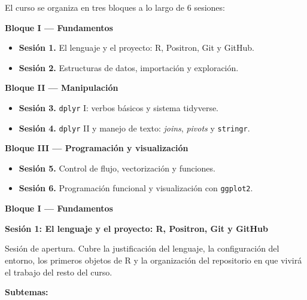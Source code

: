 \documentclass[11pt,letterpaper]{article}
\newcommand{\bloqueCurso}[1]{%
  \clearpage%
  \vspace*{0.5cm}%
  {\centering\color{main}\fontsize{26pt}{32pt}\selectfont\bfseries #1\par}%
  \vspace{0.8cm}%
}
\newcommand{\sesion}[2]{%
  \bigskip%
  {\color{main}\Large\bfseries Sesión #1: #2\par}%
  \smallskip%
}
\begin{document}
El curso se organiza en tres bloques a lo largo de 6 sesiones:

\smallskip
\noindent\textbf{\textcolor{main}{Bloque I --- Fundamentos}}
\begin{itemize}[leftmargin=*, itemsep=1pt]
    \item \textbf{Sesión 1.} El lenguaje y el proyecto: R, Positron, Git y GitHub.
    \item \textbf{Sesión 2.} Estructuras de datos, importación y exploración.
\end{itemize}

\smallskip
\noindent\textbf{\textcolor{main}{Bloque II --- Manipulación}}
\begin{itemize}[leftmargin=*, itemsep=1pt]
    \item \textbf{Sesión 3.} \texttt{dplyr} I: verbos básicos y sistema tidyverse.
    \item \textbf{Sesión 4.} \texttt{dplyr} II y manejo de texto: \textit{joins}, \textit{pivots} y \texttt{stringr}.
\end{itemize}

\smallskip
\noindent\textbf{\textcolor{main}{Bloque III --- Programación y visualización}}
\begin{itemize}[leftmargin=*, itemsep=1pt]
    \item \textbf{Sesión 5.} Control de flujo, vectorización y funciones.
    \item \textbf{Sesión 6.} Programación funcional y visualización con \texttt{ggplot2}.
\end{itemize}

\bloqueCurso{Bloque I --- Fundamentos}

\sesion{1}{El lenguaje y el proyecto: R, Positron, Git y GitHub}

Sesión de apertura. Cubre la justificación del lenguaje, la configuración del entorno, los primeros objetos de R y la organización del repositorio en que vivirá el trabajo del resto del curso.

\textbf{Subtemas:}
\end{document}

